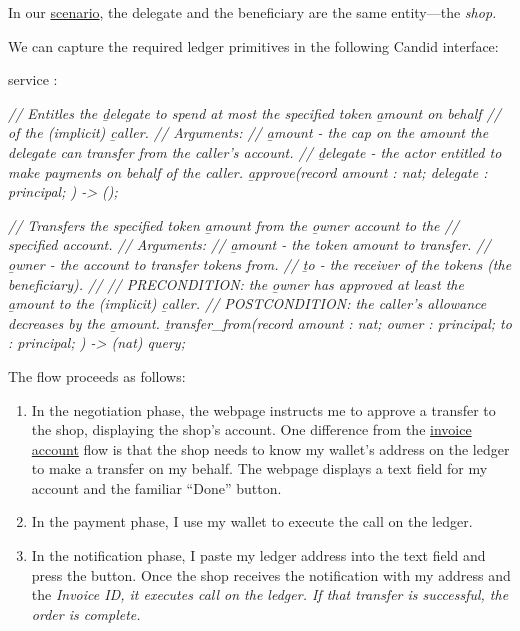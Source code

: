 \documentclass{article}
\begin{document}
In our \href{#payment-scenario}{scenario}, the delegate and the beneficiary are the same entity---the \em{shop}.

We can capture the required ledger primitives in the following Candid interface:
\begin{code}[candid]
service : {
  \em{// Entitles the \b{delegate} to spend at most the specified token \b{amount} on behalf}
  \em{// of the (implicit) \b{caller}.}
  \em{// Arguments:}
  \em{//   \b{amount} - the cap on the amount the delegate can transfer from the caller's account.}
  \em{//   \b{delegate} - the actor entitled to make payments on behalf of the caller.}
  \b{approve}(record {
    amount : nat;
    delegate : principal;
  }) -> ();

  \em{// Transfers the specified token \b{amount} from the \b{owner} account to the}
  \em{// specified account.}
  \em{// Arguments:}
  \em{//   \b{amount} - the token amount to transfer.}
  \em{//   \b{owner} - the account to transfer tokens from.}
  \em{//   \b{to} - the receiver of the tokens (the beneficiary).}
  \em{//}
  \em{// PRECONDITION: the \b{owner} has approved at least the \b{amount} to the (implicit) \b{caller}.}
  \em{// POSTCONDITION: the caller's allowance decreases by the \b{amount}.}
  \b{transfer_from}(record {
    amount : nat;
    owner : principal;
    to : principal;
  }) -> (nat) query;
}
\end{code}

The flow proceeds as follows:
\begin{enumerate}
  \item 
    In the negotiation phase, the webpage instructs me to approve a transfer to the shop, displaying the shop's account.
    One difference from the \href{#invoice-account}{invoice account} flow is that the shop needs to know my wallet's address on the ledger to make a transfer on my behalf.
    The webpage displays a text field for my account and the familiar ``Done'' button.
  \item In the payment phase, I use my wallet to execute the  call on the ledger.
  \item 
    In the notification phase, I paste my ledger address into the text field and press the button.
    Once the shop receives the notification with my address and the \em{Invoice ID}, it executes  call on the ledger.
    If that transfer is successful, the order is complete.
\end{enumerate}
\end{document}
